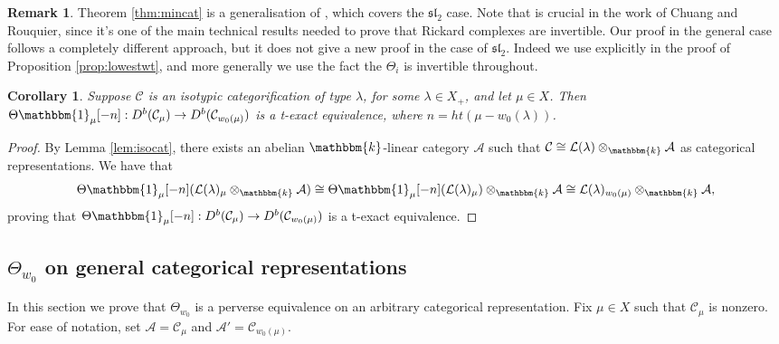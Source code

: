 \documentclass[11pt,reqno]{amsart}
\numberwithin{equation}{section}
\newtheorem{Corollary}[equation]{Corollary}
\theoremstyle{definition}
\newtheorem{Remark}[equation]{Remark}
\theoremstyle{named}
\newcommand{\cA}{\mathcal{A}}
\newcommand{\cC}{\mathcal{C}}
\newcommand{\cL}{\mathcal{L}}
\newcommand{\kk}{\mathbbm{k}}
\newcommand{\CC}{\mathbb{C}}
\newcommand{\fsl}{\mathfrak{sl}}
\newcommand{\bone}{\mathbbm{1}}
\begin{document}
\begin{Remark}
Theorem \ref{thm:mincat} is a generalisation of  \cite[Theorem 6.6]{CR}, which covers the $\fsl_2$ case.  Note that \cite[Theorem 6.6]{CR} is crucial in the work of Chuang and Rouquier, since it's one of the main technical results needed to prove that Rickard complexes are invertible.  Our proof in the general case follows a completely different approach, but   it does not give a new proof in the case of $\fsl_2$. Indeed we use \cite[Theorem 6.6]{CR} explicitly in the proof of Proposition \ref{prop:lowestwt}, and more generally we use the fact the $\Theta_i$ is invertible throughout.  
\end{Remark}

\begin{Corollary}\label{cor:mainthm}
Suppose $\cC$ is an isotypic categorification of type $\lambda$, for some $\lambda \in X_+$, and let $\mu \in X$.  Then $\Theta\bone_\mu[-n]:D^b(\cC_\mu) \to D^b(\cC_{w_0(\mu)})$ is a t-exact equivalence, where $n=ht(\mu-w_0(\lambda))$.  
\end{Corollary}

\begin{proof}
By Lemma \ref{lem:isocat}, there exists an abelian $\kk$-linear category $\cA$ such that $\cC \cong \cL(\lambda)\otimes_\kk \cA$ as categorical representations.  We have that 
$$
\Theta\bone_\mu[-n](\cL(\lambda)_\mu\otimes_\kk \cA) \cong \Theta\bone_\mu[-n](\cL(\lambda)_\mu) \otimes_\kk \cA \cong \cL(\lambda)_{w_0(\mu)}\otimes_\kk \cA,
$$
proving that $\Theta\bone_\mu[-n]:D^b(\cC_\mu) \to D^b(\cC_{w_0(\mu)})$ is a t-exact equivalence.
\end{proof}

\subsection{$\Theta_{w_0}$ on general categorical representations}\label{sec:mainpf}
In this section we prove that $\Theta_{w_0}$ is a perverse equivalence on an arbitrary categorical representation.
Fix $\mu \in X$ such that $\cC_\mu$ is nonzero.  For ease of notation, set $\cA=\cC_\mu$ and $\cA'=\cC_{w_0(\mu)}$.    
\end{document}
